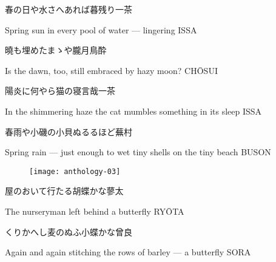 \begin{haiku}
    {\FH 春の日や水さへあれば暮残り}\hfill{\FH 一茶}

    \vin{} Spring sun
    \vin{} \vin{} in every pool of water ---
    \vin{} \vin{} \vin{} lingering \hspace{\fill} ISSA
\end{haiku}

\begin{haiku}
    {\FH 曉も埋めたまゝや朧月}\hfill{\FH 鳥酔}

    \vin{} Is the dawn, too,
    \vin{} \vin{} still embraced by
    \vin{} \vin{} \vin{} hazy moon? \hspace{\fill} CH\={O}SUI
\end{haiku}

\begin{haiku}
    {\FH 陽炎に何やら猫の寝言哉}\hfill{\FH 一茶}

    \vin{} In the shimmering haze
    \vin{} \vin{} the cat mumbles something
    \vin{} \vin{} \vin{} in its sleep \hspace{\fill} ISSA
\end{haiku}

\begin{haiku}
    {\FH 春雨や小磯の小貝ぬるるほど}\hfill{\FH 蕪村}

    \vin{} Spring rain ---
    \vin{} \vin{} just enough to wet tiny shells
    \vin{} \vin{} \vin{} on the tiny beach \hspace{\fill} BUSON
\end{haiku}

\begin{figure}
    \texttt{[image: anthology-03]}
\end{figure}

\begin{haiku}
    {\FH {}屋のおいて行たる胡蝶かな}\hfill{\FH 蓼太}

    \vin{} The nurseryman
    \vin{} \vin{} left behind
    \vin{} \vin{} \vin{} a butterfly \hspace{\fill} RY\={O}TA
\end{haiku}

\begin{haiku}
    {\FH くりかへし麦のぬふ小蝶かな}\hfill{\FH 曾良}

    \vin{} Again and again
    \vin{} \vin{} stitching the rows of barley ---
    \vin{} \vin{} \vin{} a butterfly \hspace{\fill} SORA
\end{haiku}

